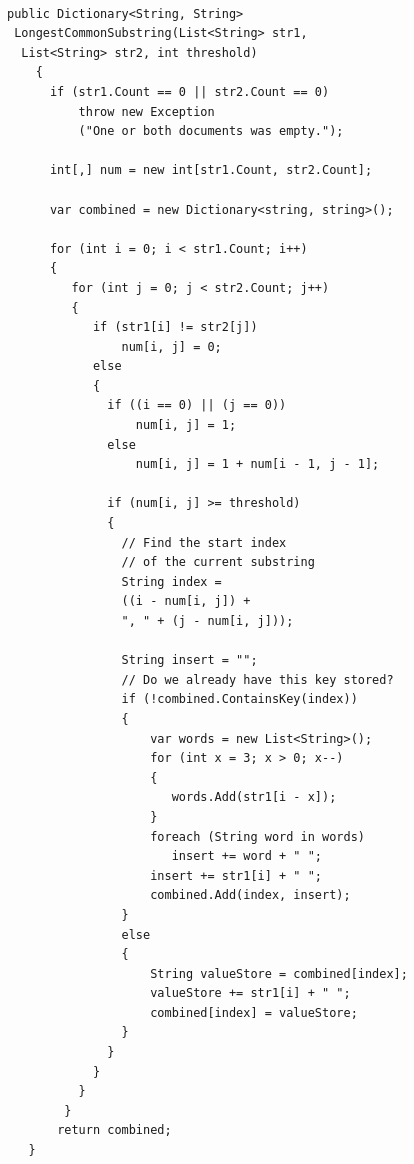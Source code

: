 \lstset{style=sharpc}
\begin{lstlisting}[caption=Modified version of LCS, captionpos=b]

public Dictionary<String, String>
 LongestCommonSubstring(List<String> str1,
  List<String> str2, int threshold)
    {
	  if (str1.Count == 0 || str2.Count == 0)
	      throw new Exception
	      ("One or both documents was empty.");

      int[,] num = new int[str1.Count, str2.Count];

      var combined = new Dictionary<string, string>();

      for (int i = 0; i < str1.Count; i++)
      {
         for (int j = 0; j < str2.Count; j++)
         {
            if (str1[i] != str2[j])
                num[i, j] = 0;
            else
            {
              if ((i == 0) || (j == 0))
                  num[i, j] = 1;
              else
                  num[i, j] = 1 + num[i - 1, j - 1];

              if (num[i, j] >= threshold)
              {
                // Find the start index 
                // of the current substring
                String index = 
                ((i - num[i, j]) + 
                ", " + (j - num[i, j]));

                String insert = "";
                // Do we already have this key stored?
                if (!combined.ContainsKey(index))
                {
                    var words = new List<String>();
                    for (int x = 3; x > 0; x--)
                    {
                       words.Add(str1[i - x]);
                    }
                    foreach (String word in words)
                       insert += word + " ";
                    insert += str1[i] + " ";
                    combined.Add(index, insert);
                }
                else
                {
                    String valueStore = combined[index];
                    valueStore += str1[i] + " ";
                    combined[index] = valueStore;
                }
              }
            }
          }
        }
       return combined;
   }

\end{lstlisting}

